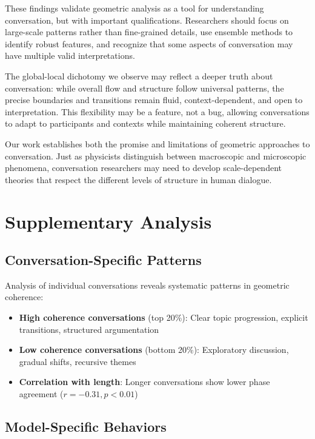 \documentclass[11pt,letterpaper]{article}
\begin{document}
These findings validate geometric analysis as a tool for understanding conversation, but with important qualifications. Researchers should focus on large-scale patterns rather than fine-grained details, use ensemble methods to identify robust features, and recognize that some aspects of conversation may have multiple valid interpretations.

The global-local dichotomy we observe may reflect a deeper truth about conversation: while overall flow and structure follow universal patterns, the precise boundaries and transitions remain fluid, context-dependent, and open to interpretation. This flexibility may be a feature, not a bug, allowing conversations to adapt to participants and contexts while maintaining coherent structure.

Our work establishes both the promise and limitations of geometric approaches to conversation. Just as physicists distinguish between macroscopic and microscopic phenomena, conversation researchers may need to develop scale-dependent theories that respect the different levels of structure in human dialogue.




\appendix

\section{Supplementary Analysis}

\subsection{Conversation-Specific Patterns}

Analysis of individual conversations reveals systematic patterns in geometric coherence:

\begin{itemize}
\item \textbf{High coherence conversations} (top 20\%): Clear topic progression, explicit transitions, structured argumentation
\item \textbf{Low coherence conversations} (bottom 20\%): Exploratory discussion, gradual shifts, recursive themes
\item \textbf{Correlation with length}: Longer conversations show lower phase agreement ($r = -0.31, p < 0.01$)
\end{itemize}

\subsection{Model-Specific Behaviors}
\end{document}
